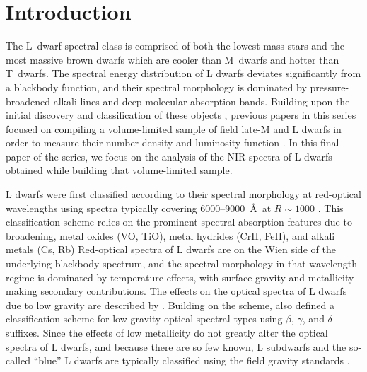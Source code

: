 \documentclass[12pt,preprint]{aastex}
\begin{document}

\clearpage
\clearpage
\section{Introduction}

The L~dwarf spectral class is comprised of both the lowest mass stars and the most massive brown dwarfs which are cooler than M~dwarfs and hotter than T~dwarfs. 
The spectral energy distribution of L dwarfs deviates significantly from a blackbody function, and their spectral morphology is dominated by pressure-broadened alkali lines and deep molecular absorption bands.
Building upon the initial discovery and classification of these objects \citep{K99,Martin99,Kirkpatrick05}, previous papers in this series focused on compiling a volume-limited sample of field late-M and L dwarfs in order to measure their number density and luminosity function \citep[Papers V, IX, and X]{Cruz03,Cruz07,Reid08}. 
In this final paper of the series, we focus on the analysis of the NIR spectra of L dwarfs obtained while building that volume-limited sample.

L dwarfs were first classified according to their spectral morphology at red-optical wavelengths using spectra typically covering 6000--9000~\AA~at $R\sim1000$ \citep{K99,Kirkpatrick05}. 
This classification scheme relies on the prominent spectral absorption features due to  broadening, metal oxides (VO, TiO), metal hydrides (CrH, FeH), and alkali metals (Cs, Rb)
Red-optical spectra of L dwarfs are on the Wien side of the underlying blackbody spectrum, and the spectral morphology in that wavelength regime is dominated by temperature effects, with surface gravity and metallicity making secondary contributions. 
The effects on the optical spectra of L dwarfs due to low gravity are described by \citet{Cruz09_lowg}. 
Building on the \citet{K99} scheme, \citet{Cruz09_lowg} also defined a classification scheme for low-gravity optical spectral types using $\beta$, $\gamma$, and $\delta$ suffixes. 
Since the effects of low metallicity do not greatly alter the optical spectra of L dwarfs, and because there are so few known, L subdwarfs and the so-called ``blue'' L dwarfs are typically  classified using the field gravity standards \citep{Burgasser07_subdwarfs, Burgasser08_blue, Kirkpatrick10, Kirkpatrick:2014kv}.
\end{document}
